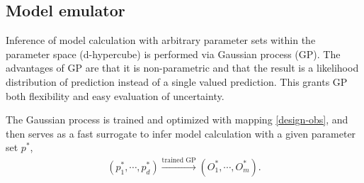 \documentclass[aps,prl,twocolumn,groupedaddress]{revtex4-1}
\begin{document}
	\subsection{Model emulator}
	Inference of model calculation with arbitrary parameter sets within the parameter space (d-hypercube) is performed via Gaussian process (GP). 
	The advantages of GP are that it is non-parametric and that the result is a likelihood distribution of prediction instead of a single valued prediction. 
	This grants GP both flexibility and easy evaluation of uncertainty.
	
	 The Gaussian process is trained and optimized with mapping \ref{design-obs}, and then serves as a fast surrogate to infer model calculation with a given parameter set $p^*$,
	 \begin{eqnarray}
	 	(p^*_1, \cdots, p^*_d) \xrightarrow{\textrm{trained GP}} (O^*_1, \cdots, O^*_m).
	 \end{eqnarray}
	 
\end{document}
